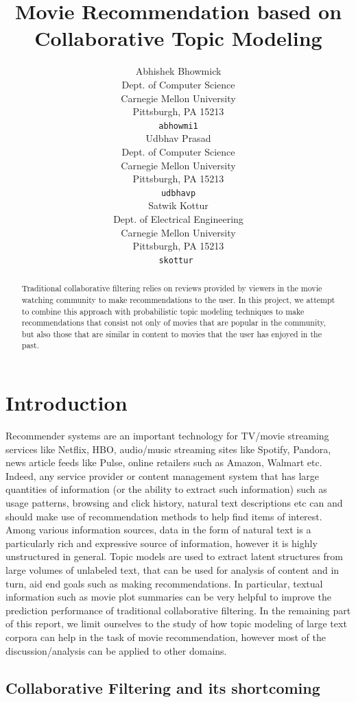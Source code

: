 \documentclass{article} %
\title{Movie Recommendation based on Collaborative Topic Modeling}
\author{
Abhishek Bhowmick \\
Dept. of Computer Science\\
Carnegie Mellon University\\
Pittsburgh, PA 15213 \\
\texttt{abhowmi1} \\
\And
Udbhav Prasad \\
Dept. of Computer Science\\
Carnegie Mellon University\\
Pittsburgh, PA 15213 \\
\texttt{udbhavp} \\
\And
Satwik Kottur \\
Dept. of Electrical Engineering\\
Carnegie Mellon University\\
Pittsburgh, PA 15213 \\
\texttt{skottur}\ \\
}
\begin{document}
\maketitle

\begin{abstract}
Traditional collaborative filtering relies on reviews provided by viewers
in the movie watching community to make recommendations to the user. In this
project, we attempt to combine this approach with probabilistic topic modeling
techniques to make recommendations that consist not only of movies that are
popular in the community, but also those that are similar in content to movies
that the user has enjoyed in the past.  
\end{abstract}

\section{Introduction}

Recommender systems are an important technology for TV/movie streaming
services like Netflix, HBO, audio/music streaming sites like Spotify, 
Pandora, news article feeds like Pulse, online retailers such as Amazon, Walmart
etc. Indeed, any service provider or content management system that has large
quantities of information (or the ability to extract such information) such as 
usage patterns, browsing and click history, natural text descriptions etc can
and should make use of recommendation methods to help find items of interest. 
Among various information sources, data in the form of natural text is a 
particularly rich and expressive source of information, however it is highly 
unstructured in general. Topic models are used to extract latent structures
from large volumes of unlabeled text, that can be used for analysis of 
content and in turn, aid end goals such as making recommendations. In
particular, textual information such as movie plot summaries can be very
helpful to improve the prediction performance of traditional
collaborative filtering. In the remaining 
part of this report, we limit ourselves to the study of how topic modeling of 
large text corpora can help in the task of movie recommendation, however most 
of the discussion/analysis can be applied to other domains.  

\subsection{Collaborative Filtering and its shortcoming}
\end{document}
